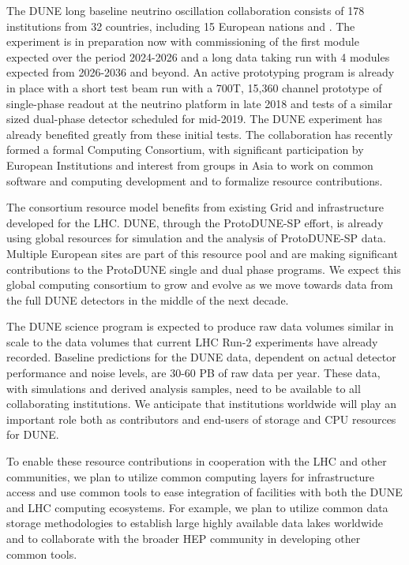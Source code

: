 The DUNE long baseline neutrino oscillation collaboration consists of 178 institutions from 32 countries, including 15 European nations and . The experiment is in preparation now with commissioning of the first module expected over the period 2024-2026 and a long data taking run with 4 modules expected from 2026-2036 and beyond.  An active prototyping program is already in place with a short test beam run with a 700T, 15,360 channel prototype of single-phase readout at the neutrino platform  in late 2018 and tests of a similar sized dual-phase detector scheduled for mid-2019.   The DUNE experiment has already  benefited greatly from these initial tests.  The collaboration has recently formed a formal Computing Consortium, with significant participation by European Institutions and interest from groups in Asia to work on common software and computing development and to formalize resource contributions.

The consortium resource model benefits from existing Grid and  infrastructure developed for the LHC.  DUNE, through  the ProtoDUNE-SP effort, is already using global resources for simulation and the analysis of ProtoDUNE-SP data.  Multiple European sites are part of this resource pool and are making significant contributions to the ProtoDUNE single and dual phase programs.  We expect this global computing consortium to grow and evolve as we move towards data from the full DUNE detectors in the middle of the next decade.

The DUNE science program is expected to produce raw data volumes similar in scale to the data volumes that current LHC Run-2 experiments have already recorded.  Baseline predictions for the DUNE data, dependent on actual detector performance and noise levels, are 30-60 PB of raw data per year.  These data, with simulations and derived analysis samples, need to be available to all collaborating institutions.  We anticipate that institutions worldwide will play an important role both as contributors and end-users of storage and CPU resources for DUNE.

To enable these resource contributions in cooperation with the LHC and other communities, we plan to utilize common computing layers for infrastructure access and use common tools to ease integration of facilities with both the DUNE and LHC computing ecosystems.  For example, we plan to utilize common data storage methodologies to establish large highly available data lakes worldwide  and to collaborate with the broader HEP community in developing other common tools.

